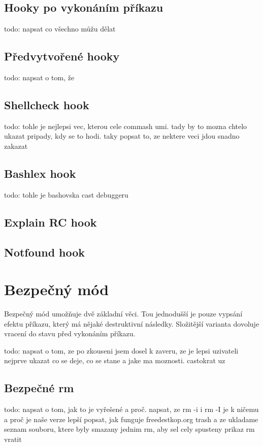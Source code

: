 \documentclass[thesis=M,czech]{FITthesis}[2012/06/26]
\begin{document}
\subsection{Hooky po vykonáním příkazu}
todo: napsat co všechno můžu dělat

\subsection{Předvytvořené hooky}
todo: napsat o tom, že 

\subsection{Shellcheck hook}
todo: tohle je nejlepsi vec, kterou cele commash umi. tady by to mozna chtelo ukazat pripady, kdy se to hodi. taky popsat to, ze nektere veci jdou snadno zakazat

\subsection{Bashlex hook}
todo: tohle je bashovska cast debuggeru

\subsection{Explain RC hook}

\subsection{Notfound hook}

%
%
%
%
%
\section{Bezpečný mód}
Bezpečný mód umožňuje dvě základní věci. Tou jednodušší je pouze vypsání efektu příkazu, který má nějaké destruktivní následky. Složitější varianta dovoluje vracení do stavu před vykonáním příkazu.

todo: napsat o tom, ze po zkouseni jsem dosel k zaveru, ze je lepsi uzivateli nejprve ukazat co se deje, co se stane a jake ma moznosti. castokrat uz 


\subsection{Bezpečné rm}
todo: napsat o tom, jak to je vyřešené a proč. napsat, ze rm -i i rm -I je k ničemu a proč je naše verze lepší
popsat, jak funguje freedestkop.org trash a ze ukladame seznam souboru, ktere byly smazany jednim rm, aby sel cely spusteny prikaz rm vratit 
\end{document}
